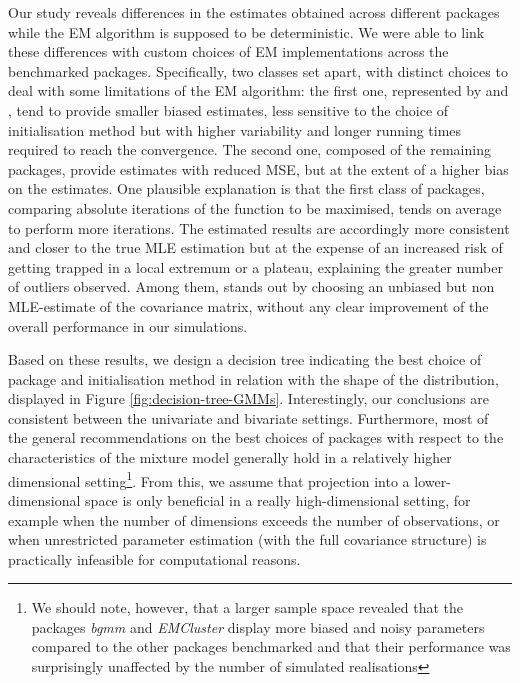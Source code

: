 Our study reveals differences in the estimates obtained across different packages while the EM algorithm is supposed to be deterministic. We were able to link these differences with custom choices of EM implementations across the benchmarked packages.
Specifically, two classes set apart, with distinct choices to deal with some limitations of the EM algorithm: the first
one, represented by  and , tend to provide
smaller biased estimates, less sensitive to the choice of initialisation
method but with higher variability and longer running times required to reach the convergence. The second one, composed of the remaining
packages, provide estimates with reduced MSE, but at the extent of a
higher bias on the estimates. One plausible explanation is that the first class of packages, comparing absolute iterations of the function to be maximised, tends on average to perform more iterations. The estimated results are accordingly more consistent and closer to the true MLE estimation but at the expense of an increased risk of getting trapped in a local extremum or a plateau, explaining the greater number of outliers observed. Among them,  stands out by choosing
an unbiased but non MLE-estimate of the covariance matrix, without any clear improvement
of the overall performance in our simulations.

Based on these results, we design a decision tree indicating the best choice of package and initialisation method in relation with the shape of the distribution, displayed in Figure \ref{fig:decision-tree-GMMs}. Interestingly, our conclusions are consistent between the univariate and bivariate settings. \color{blue} Furthermore, most of the general recommendations on the best choices of packages with respect to the characteristics of the mixture model generally hold in a relatively higher dimensional setting\footnote{We should note, however, that a larger sample space revealed that the packages \textit{bgmm} and \textit{EMCluster} display more biased and noisy parameters compared to the other packages benchmarked and that their performance was surprisingly unaffected by the number of simulated realisations}. From this, we assume that projection into a lower-dimensional space is only beneficial in a really high-dimensional setting, for example when the number of dimensions exceeds the number of observations, or when unrestricted parameter estimation (with the full covariance structure) is practically infeasible for computational reasons.
\color{black}

